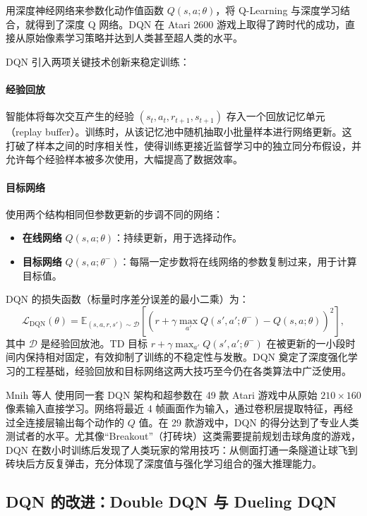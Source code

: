 用深度神经网络来参数化动作值函数 $Q(s,a; \theta)$，将 Q-Learning 与深度学习结合，就得到了深度 Q 网络\cite{mnih2013playingatarideepreinforcement,Volodymyr2015Human}。DQN 在 Atari 2600 游戏上取得了跨时代的成功，直接从原始像素学习策略并达到人类甚至超人类的水平。

DQN 引入两项关键技术创新来稳定训练：

\paragraph{经验回放} 智能体将每次交互产生的经验 $(s_t, a_t, r_{t+1}, s_{t+1})$ 存入一个回放记忆单元（replay buffer）。训练时，从该记忆池中随机抽取小批量样本进行网络更新。这打破了样本之间的时序相关性，使得训练更接近监督学习中的独立同分布假设，并允许每个经验样本被多次使用，大幅提高了数据效率。

\paragraph{目标网络} 使用两个结构相同但参数更新的步调不同的网络：
\begin{itemize}
\item \textbf{在线网络} $Q(s,a; \theta)$：持续更新，用于选择动作。
\item \textbf{目标网络} $Q(s,a; \theta^-)$：每隔一定步数将在线网络的参数复制过来，用于计算目标值。
\end{itemize}
DQN 的损失函数（标量时序差分误差的最小二乘）为：
\begin{equation}\label{eq:dqn_loss}
\mathcal{L}_{\text{DQN}}(\theta) = \mathbb{E}_{(s,a,r,s') \sim \mathcal{D}} \left[ \left( r + \gamma \max_{a'} Q(s', a'; \theta^-) - Q(s, a; \theta) \right)^2 \right],
\end{equation}
其中 $\mathcal{D}$ 是经验回放池。TD 目标 $r + \gamma \max_{a'} Q(s', a'; \theta^-)$ 在被更新的一小段时间内保持相对固定，有效抑制了训练的不稳定性与发散。DQN 奠定了深度强化学习的工程基础，经验回放和目标网络这两大技巧至今仍在各类算法中广泛使用。

Mnih 等人\cite{Volodymyr2015Human} 使用同一套 DQN 架构和超参数在 49 款 Atari 游戏中从原始 $210\times160$ 像素输入直接学习。网络将最近 4 帧画面作为输入，通过卷积层提取特征，再经过全连接层输出每个动作的 $Q$ 值。在 29 款游戏中，DQN 的得分达到了专业人类测试者的水平。尤其像“Breakout”（打砖块）这类需要提前规划击球角度的游戏，DQN 在数小时训练后发现了人类玩家的常用技巧：从侧面打通一条隧道让球飞到砖块后方反复弹击，充分体现了深度值与强化学习组合的强大推理能力。


\subsection{DQN 的改进：Double DQN 与 Dueling DQN}

